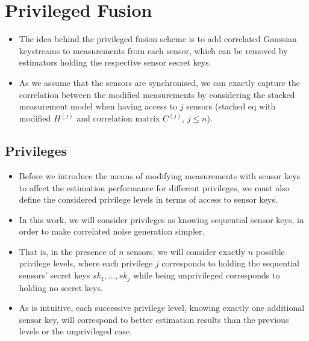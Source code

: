 \documentclass[conference]{IEEEtran}
\begin{document}
\section{Privileged Fusion}\label{sec:scheme}
\begin{itemize}
  \item The idea behind the privileged fusion scheme is to add correlated Gaussian keystreams to measurements from each sensor, which can be removed by estimators holding the respective sensor secret keys.
  \item As we assume that the sensors are synchronised, we can exactly capture the correlation between the modified measurements by considering the stacked measurement model when having access to $j$ sensors (stacked eq with modified $H^{(j)}$ and correlation matrix $C^{(j)}$, $j\leq n$).
\end{itemize}
\subsection{Privileges}\label{subsec:scheme_privileges}
\begin{itemize}
  \item Before we introduce the means of modifying measurements with sensor keys to affect the estimation performance for different privileges, we must also define the considered privilege levels in terms of access to sensor keys.
  \item In this work, we will consider privileges as knowing sequential sensor keys, in order to make correlated noise generation simpler.
  \item That is, in the presence of $n$ sensors, we will consider exactly $n$ possible privilege levels, where each privilege $j$ corresponds to holding the sequential sensors' secret keys $sk_1,...,sk_j$ while being unprivileged corresponds to holding no secret keys.
  \item As is intuitive, each successive privilege level, knowing exactly one additional sensor key, will correspond to better estimation results than the previous levels or the unprivileged case.
\end{itemize}
\end{document}

